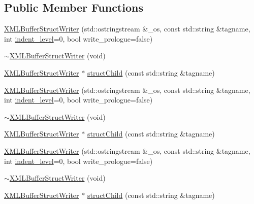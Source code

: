 \subsection*{Public Member Functions}
\begin{DoxyCompactItemize}
\item 
\mbox{\hyperlink{classXMLStructWriterAPI_1_1XMLBufferStructWriter_adc348003ff0e12b5a820972cbc51a376}{X\+M\+L\+Buffer\+Struct\+Writer}} (std\+::ostringstream \&\+\_\+os, const std\+::string \&tagname, int \mbox{\hyperlink{classXMLStructWriterAPI_1_1XMLStructWriterBase_ac592a077855a1377b390f4abff506e38}{indent\+\_\+level}}=0, bool write\+\_\+prologue=false)
\item 
\mbox{\hyperlink{classXMLStructWriterAPI_1_1XMLBufferStructWriter_a00bf336d98d848ad4552ee46ea32dd78}{$\sim$\+X\+M\+L\+Buffer\+Struct\+Writer}} (void)
\item 
\mbox{\hyperlink{classXMLStructWriterAPI_1_1XMLBufferStructWriter}{X\+M\+L\+Buffer\+Struct\+Writer}} $\ast$ \mbox{\hyperlink{classXMLStructWriterAPI_1_1XMLBufferStructWriter_a1c5689221a56527dfd86ac071db3a534}{struct\+Child}} (const std\+::string \&tagname)
\item 
\mbox{\hyperlink{classXMLStructWriterAPI_1_1XMLBufferStructWriter_adc348003ff0e12b5a820972cbc51a376}{X\+M\+L\+Buffer\+Struct\+Writer}} (std\+::ostringstream \&\+\_\+os, const std\+::string \&tagname, int \mbox{\hyperlink{classXMLStructWriterAPI_1_1XMLStructWriterBase_ac592a077855a1377b390f4abff506e38}{indent\+\_\+level}}=0, bool write\+\_\+prologue=false)
\item 
\mbox{\hyperlink{classXMLStructWriterAPI_1_1XMLBufferStructWriter_a00bf336d98d848ad4552ee46ea32dd78}{$\sim$\+X\+M\+L\+Buffer\+Struct\+Writer}} (void)
\item 
\mbox{\hyperlink{classXMLStructWriterAPI_1_1XMLBufferStructWriter}{X\+M\+L\+Buffer\+Struct\+Writer}} $\ast$ \mbox{\hyperlink{classXMLStructWriterAPI_1_1XMLBufferStructWriter_a1c5689221a56527dfd86ac071db3a534}{struct\+Child}} (const std\+::string \&tagname)
\item 
\mbox{\hyperlink{classXMLStructWriterAPI_1_1XMLBufferStructWriter_adc348003ff0e12b5a820972cbc51a376}{X\+M\+L\+Buffer\+Struct\+Writer}} (std\+::ostringstream \&\+\_\+os, const std\+::string \&tagname, int \mbox{\hyperlink{classXMLStructWriterAPI_1_1XMLStructWriterBase_ac592a077855a1377b390f4abff506e38}{indent\+\_\+level}}=0, bool write\+\_\+prologue=false)
\item 
\mbox{\hyperlink{classXMLStructWriterAPI_1_1XMLBufferStructWriter_a00bf336d98d848ad4552ee46ea32dd78}{$\sim$\+X\+M\+L\+Buffer\+Struct\+Writer}} (void)
\item 
\mbox{\hyperlink{classXMLStructWriterAPI_1_1XMLBufferStructWriter}{X\+M\+L\+Buffer\+Struct\+Writer}} $\ast$ \mbox{\hyperlink{classXMLStructWriterAPI_1_1XMLBufferStructWriter_a1c5689221a56527dfd86ac071db3a534}{struct\+Child}} (const std\+::string \&tagname)
\end{DoxyCompactItemize}
